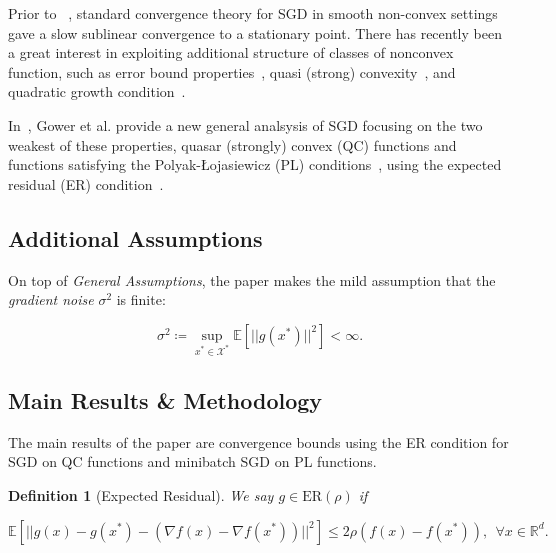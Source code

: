 \documentclass{article}
\newtheorem{definition}{Definition}[section]
\begin{document}
Prior to ~\cite{https://doi.org/10.48550/arxiv.2006.10311}, standard convergence theory for SGD in smooth non-convex settings gave a slow sublinear convergence to a stationary point. There has recently been a great interest
in exploiting additional structure of classes of nonconvex function, such as error bound properties~\cite{Fabian2010ErrorBN},
quasi (strong) convexity~\cite{https://doi.org/10.48550/arxiv.1906.11985, JMLR:v19:16-465, https://doi.org/10.48550/arxiv.1710.00797}, and quadratic growth condition~\cite{doi:10.1137/S1052623499359178}.

In~\cite{https://doi.org/10.48550/arxiv.2006.10311}, Gower et al. provide a new general analsysis of SGD focusing on the two weakest of these properties, quasar (strongly) convex (QC) functions and functions satisfying the
Polyak-Łojasiewicz (PL) conditions~\cite{POLYAK1963864}, using the expected residual (ER) condition~\cite{Gower2021StochasticQM}.

\subsection{Additional Assumptions}

On top of \textit{General Assumptions}, the paper makes the mild assumption that the \textit{gradient noise} $\sigma^2$ is finite:

\begin{equation}
	\sigma^2 \coloneqq \sup_{x^*\in\mathcal{X^*}} \mathbb{E}\left[||g(x^*)||^2\right] < \infty.
\end{equation}

\subsection{Main Results \& Methodology}

The main results of the paper are convergence bounds using the ER condition for SGD on QC functions and minibatch SGD on PL functions.

\begin{definition}[Expected Residual]
	We say $g\in\text{ER}(\rho)$ if

	\[
		\mathbb{E}\left[||g(x) - g(x^*) - (\nabla f(x) - \nabla f(x^*))||^2\right] \leq 2\rho (f(x) - f(x^*)), \ \ \forall x\in\mathbb{R}^d.
	\]
\end{definition}
\end{document}
